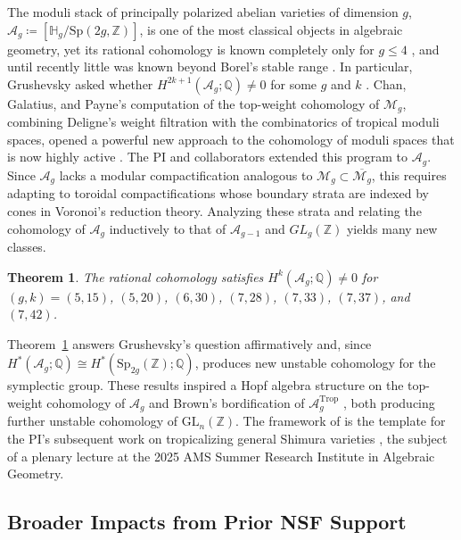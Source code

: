 \documentclass[11pt,reqno]{amsart}
\newtheorem{theorem}[lemma]{Theorem}
\theoremstyle{remark}
\newcommand{\GL}{{GL}}
\newcommand{\HH}{\mathbb{H}}
\newcommand{\QQ}{\mathbb{Q}}
\newcommand{\ZZ}{\mathbb{Z}}
\newcommand{\cA}{\mathcal{A}}
\newcommand{\cM}{\mathcal{M}}
\DeclareMathOperator{\trop}{Trop}
\begin{document}
The moduli stack of principally polarized abelian varieties of dimension $g$, $\cA_g\coloneqq[\HH_g/\mathrm{Sp}(2g, \ZZ)]$, is one of the most classical objects in algebraic geometry, yet its rational cohomology is known completely only for $g\leq 4$ \cite{igusa62,hain02,HT12,HT18}, and until recently little was known beyond Borel's stable range \cite{borel74}. In particular, Grushevsky asked whether $H^{2k+1}(\cA_{g};\QQ)\neq0$ for some $g$ and $k$ \cite{grushevsky09}. Chan, Galatius, and Payne's computation of the top-weight cohomology of $\cM_g$, combining Deligne's weight filtration with the combinatorics of tropical moduli spaces, opened a powerful new approach to the cohomology of moduli spaces \cite{CGP21} that is now highly active \cite{CGP22,payneWillwacher21,BCGY23,canningLarsonPayne23}. The PI and collaborators extended this program to $\cA_g$. Since $\cA_g$ lacks a modular compactification analogous to $\cM_g \subset \overline{\cM_g}$, this requires adapting \cite{CGP21} to toroidal compactifications whose boundary strata are indexed by cones in Voronoi's reduction theory. Analyzing these strata and relating the cohomology of $\cA_g$ inductively to that of $\cA_{g-1}$ and $\GL_g(\ZZ)$ yields many new classes.

\begin{theorem}\cite[Thm.~A]{BBCMMW24}\label{thm:Ag}
The rational cohomology satisfies $H^{k}(\cA_{g};\QQ)\neq0$ for $(g,k)=(5,15)$, $(5,20)$, $(6,30)$, $(7,28)$, $(7,33)$, $(7,37)$, and $(7,42)$.
\end{theorem}

Theorem~\ref{thm:Ag} answers Grushevsky's question affirmatively and, since $H^*(\cA_g;\QQ) \cong H^*(\mathrm{Sp}_{2g}(\ZZ);\QQ)$, produces new unstable cohomology for the symplectic group. These results inspired a Hopf algebra structure on the top-weight cohomology of $\cA_{g}$ \cite{BCGP24} and Brown's bordification of $\cA_g^{\trop}$ \cite{Brown23}, both producing further unstable cohomology of $\mathrm{GL}_n(\ZZ)$. The framework of \cite{BBCMMW24} is the template for the PI's subsequent work on tropicalizing general Shimura varieties \cite{ABBCV25,ABBCV26}, the subject of a plenary lecture at the 2025 AMS Summer Research Institute in Algebraic Geometry.

\subsection{Broader Impacts from Prior NSF Support}\label{subsec:prior-broader-impacts}
\end{document}
